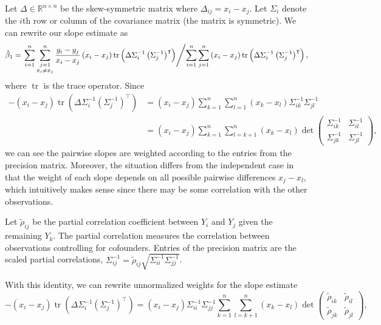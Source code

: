\documentclass[11pt, letterpaper]{article}
\begin{document}
{\begin{enumerate}[(a)]
\begin{description}
    Let $\Delta \in \mathbb{R}^{n \times n}$ be the skew-symmetric matrix where
    $\Delta_{ij} = x_i - x_j$. Let $\Sigma_i$ denote the $i$th row or column of
    the covariance matrix (the matrix is symmetric). We can rewrite our slope
    estimate as
    \begin{equation*}
      \hat{\beta}_1 = \left.\sum_{i=1}^n\sum_{\substack{j=1 \\ x_i \neq x_j}}^n
      \frac{y_i - y_j}{x_i - x_j}\left(x_i - x_j\right)\operatorname{tr}\left(
      \Delta\Sigma_i^{-1}\left(\Sigma_j^{-1}\right)^\intercal
    \right)
    \middle/
    \sum_{i=1}^n\sum_{j=1}^n\left(x_i - x_j\right)\operatorname{tr}\left(
      \Delta\Sigma_i^{-1}\left(\Sigma_j^{-1}\right)^\intercal
    \right),\right.
    \end{equation*}
    where $\operatorname{tr}$ is the trace operator. Since
    \begin{align}
      -\left(x_i - x_j\right)\operatorname{tr}\left(
        \Delta\Sigma_i^{-1}\left(\Sigma_j^{-1}\right)^\intercal
      \right) 
      &= \left(x_i - x_j\right)\sum_{k=1}^n\sum_{l=1}^n
        \left(x_k - x_l\right)\Sigma_{ik}^{-1}\Sigma_{jl}^{-1} \nonumber \\
      &= \left(x_i - x_j\right)\sum_{k=1}^n\sum_{l=k + 1}^n
        \left(x_k - x_l\right)\det\begin{pmatrix}
          \Sigma_{ik}^{-1} & \Sigma_{il}^{-1} \\
          \Sigma_{jk}^{-1} & \Sigma_{jl}^{-1}
        \end{pmatrix},
    \end{align}
    we can see the pairwise slopes are weighted according to the entries from
    the precision matrix. Moreover, the situation differs from the independent
    case in that the weight of each slope depends on all possible pairwise
    differences $x_j - x_l$, which intuitively makes sense since there may be
    some correlation with the other observations.

    Let $\tilde{\rho}_{ij}$ be the partial correlation coefficient between $Y_i$
    and $Y_j$ given the remaining $Y_k$. The partial correlation measures the
    correlation between observations controlling for cofounders. Entries of the
    precision matrix are the scaled partial correlations,
    $\Sigma_{ij}^{-1} = \tilde{\rho}_{ij}\sqrt{\Sigma_{ii}^{-1}\Sigma_{jj}^{-1}}$.

    With this identity, we can rewrite unnormalized weights for the slope
    estimate
    \begin{equation}
      -\left(x_i - x_j\right)\operatorname{tr}\left(
        \Delta\Sigma_i^{-1}\left(\Sigma_j^{-1}\right)^\intercal
      \right) = \left(x_i - x_j\right)
      \Sigma_{ii}^{-1}\Sigma_{jj}^{-1}
      \sum_{k=1}^n\sum_{l=k + 1}^n
      \left(x_k - x_l\right)\det\begin{pmatrix}
        \tilde{\rho}_{ik} & \tilde{\rho}_{il} \\
        \tilde{\rho}_{jk} & \tilde{\rho}_{jl}
        \end{pmatrix},
        \label{eqn:p2_slope_correlation}
    \end{equation}
    

\end{description}
\end{enumerate}}
\end{document}

